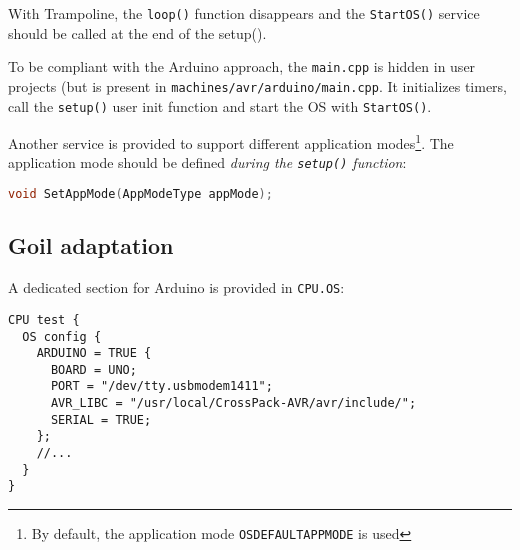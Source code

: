 With Trampoline, the \texttt{loop()} function disappears and the \texttt{StartOS()} service should be called at the end of the setup().

To be compliant with the Arduino approach, the \texttt{main.cpp} is hidden in user projects (but is present in \texttt{machines/avr/arduino/main.cpp}. It initializes timers, call the \texttt{setup()} user init function and start the OS with \texttt{StartOS()}. 

Another service is provided to support different application modes\footnote{By default, the application mode \texttt{OSDEFAULTAPPMODE} is used}. The application mode should be defined \emph{during the \texttt{setup()} function}:
\begin{lstlisting}[language=C]
void SetAppMode(AppModeType appMode);
\end{lstlisting}


\subsection{Goil adaptation}
A dedicated section for Arduino is provided in  \texttt{CPU.OS}:
\begin{lstlisting}[language=OIL]
CPU test {    
  OS config {
    ARDUINO = TRUE {
      BOARD = UNO;
      PORT = "/dev/tty.usbmodem1411";
      AVR_LIBC = "/usr/local/CrossPack-AVR/avr/include/";
      SERIAL = TRUE;
    };
    //...
  }
}
\end{lstlisting}

